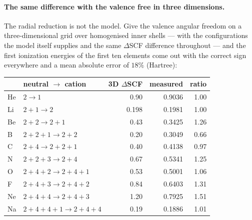 \documentclass[11pt]{article}
\begin{document}
\paragraph{The same difference with the valence free in three dimensions.} The radial reduction is
not the model. Give the valence angular freedom on a three-dimensional grid over homogenised inner
shells --- with the configurations the model itself supplies and the same $\Delta$SCF difference
throughout --- and the first ionization energies of the first ten elements come out with the correct
sign everywhere and a mean absolute error of $18\%$ (Hartree):

\begin{center}
\begin{tabular}{llrrr}
\toprule
 & neutral $\to$ cation & 3D $\Delta$SCF & measured & ratio \\
\midrule
He & $2 \to 1$                      & 0.90  & 0.9036 & 1.00 \\
Li & $2{+}1 \to 2$                  & 0.198 & 0.1981 & 1.00 \\
Be & $2{+}2 \to 2{+}1$              & 0.43  & 0.3425 & 1.26 \\
B  & $2{+}2{+}1 \to 2{+}2$          & 0.20  & 0.3049 & 0.66 \\
C  & $2{+}4 \to 2{+}2{+}1$          & 0.40  & 0.4138 & 0.97 \\
N  & $2{+}2{+}3 \to 2{+}4$          & 0.67  & 0.5341 & 1.25 \\
O  & $2{+}4{+}2 \to 2{+}4{+}1$      & 0.53  & 0.5001 & 1.06 \\
F  & $2{+}4{+}3 \to 2{+}4{+}2$      & 0.84  & 0.6403 & 1.31 \\
Ne & $2{+}4{+}4 \to 2{+}4{+}3$      & 1.20  & 0.7925 & 1.51 \\
Na & $2{+}4{+}4{+}1 \to 2{+}4{+}4$  & 0.19  & 0.1886 & 1.01 \\
\bottomrule
\end{tabular}
\end{center}
\end{document}

